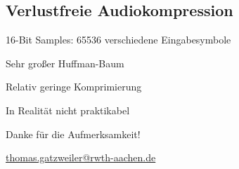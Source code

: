 \documentclass[xcolor=dvipsnames,presentation]{beamer}    %
\makeatletter
\renewcommand*{\email}{\url{thomas.gatzweiler@rwth-aachen.de}}
\newenvironment{witemize}{\itemize\setlength{\itemsep}{1em}}{\enditemize}
\makeatother
\begin{document}
\subsection{Verlustfreie Audiokompression}
\begin{frame}{\insertsubsection}
\begin{witemize}
\item 16-Bit Samples: 65536 verschiedene Eingabesymbole
\item Sehr großer Huffman-Baum
\item Relativ geringe Komprimierung
\item In Realität nicht praktikabel
\end{witemize}
\end{frame}


\begin{frame}[label=finalSlide]
  \label{LastPage}
  \begin{center}
    \vfill
    {\Large
    \textcolor{i6blue}{Danke für die Aufmerksamkeit!}
    }
     \vfill
     \inserttitle
    \vfill
    {\Large \insertauthor}
    \vfill

    \email{}
  \end{center}
\end{frame}
\end{document}
